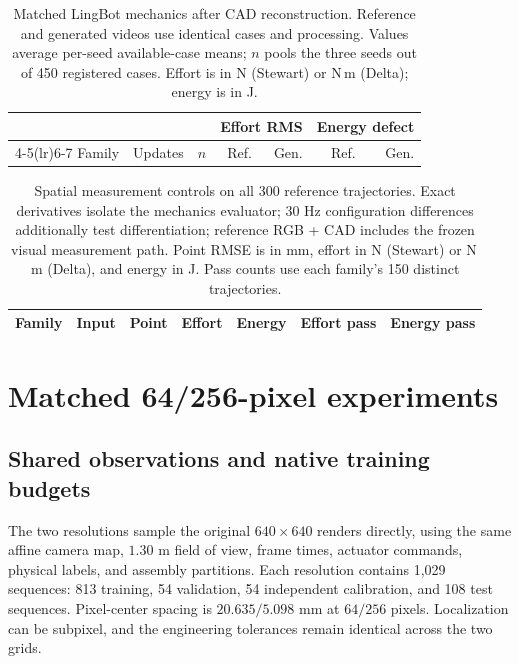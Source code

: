 \documentclass[10pt,twocolumn,letterpaper]{article}
\begin{document}
\begin{table}[t]
\caption{Matched LingBot mechanics after CAD reconstruction. Reference and generated videos use identical cases and processing. Values average per-seed available-case means; $n$ pools the three seeds out of 450 registered cases. Effort is in N (Stewart) or N\,m (Delta); energy is in J.}
\label{app:spatial-reference}
\centering\small
\setlength{\tabcolsep}{2.5pt}
\begin{tabular}{llrrrrr}
\toprule
& & & \multicolumn{2}{c}{Effort RMS} & \multicolumn{2}{c}{Energy defect}\\
\cmidrule(lr){4-5}\cmidrule(lr){6-7}
Family & Updates & $n$ & Ref. & Gen. & Ref. & Gen.\\
\midrule

\bottomrule
\end{tabular}
\end{table}

\begin{table}[t]
\caption{Spatial measurement controls on all 300 reference trajectories. Exact derivatives isolate the mechanics evaluator; 30 Hz configuration differences additionally test differentiation; reference RGB + CAD includes the frozen visual measurement path. Point RMSE is in mm, effort in N (Stewart) or N\,m (Delta), and energy in J. Pass counts use each family's 150 distinct trajectories.}
\label{app:spatial-controls}
\centering\small
\begin{tabular}{llrrrrr}
\toprule
Family & Input & Point & Effort & Energy & Effort pass & Energy pass\\
\midrule

\bottomrule
\end{tabular}
\end{table}

\section{Matched 64/256-pixel experiments}
\label{app:resolution}
\subsection{Shared observations and native training budgets}
The two resolutions sample the original $640\times640$ renders directly, using the same affine camera map, $1.30$ m field of view, frame times, actuator commands, physical labels, and assembly partitions. Each resolution contains 1,029 sequences: 813 training, 54 validation, 54 independent calibration, and 108 test sequences. Pixel-center spacing is $20.635/5.098$ mm at $64/256$ pixels. Localization can be subpixel, and the engineering tolerances remain identical across the two grids.
\end{document}
